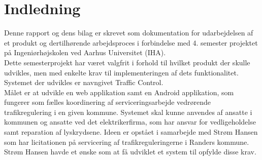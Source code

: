\chapter{Indledning}
Denne rapport og dens bilag er skrevet som dokumentation for udarbejdelsen af et produkt
og dertilhørende arbejdsproces i forbindelse med 4. semester projektet på Ingeniørhøjskolen
ved Aarhus Universitet (IHA).\\
Dette semesterprojekt har været valgfrit i forhold til hvilket produkt der skulle udvikles, men med
enkelte krav til implementeringen af dets funktionalitet.\\
Systemet der udvikles er navngivet Traffic Control.\\
\newline
Målet er at udvikle en web applikation samt en Android applikation, som fungerer som fælles koordinering af serviceringsarbejde vedrørende trafikregulering i en given kommune. Systemet skal kunne anvendes af ansatte i kommunen og ansatte ved det elektrikerfirma, som har ansvar for vedligeholdelse samt reparation af lyskrydsene.
\newline
Ideen er opstået i samarbejde med Strøm Hansen som har licitationen på servicering af trafikreguleringerne i Randers kommune. Strøm Hansen havde et ønske som at få udviklet et system til opfylde disse krav.
\newline 


